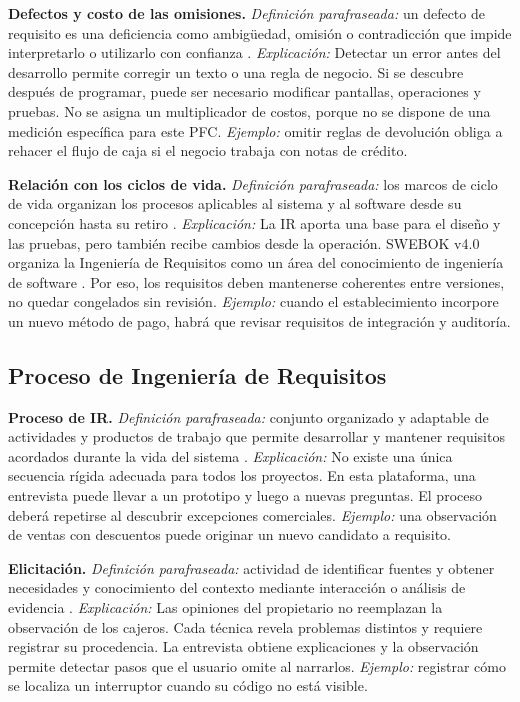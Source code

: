 \documentclass[onecolumn,12pt,a4paper]{IEEEtran}
\begin{document}
\textbf{Defectos y costo de las omisiones.} \emph{Definición parafraseada:} un defecto de requisito es una deficiencia como ambigüedad, omisión o contradicción que impide interpretarlo o utilizarlo con confianza \cite{iso29148,wiegers2013}. \emph{Explicación:} Detectar un error antes del desarrollo permite corregir un texto o una regla de negocio. Si se descubre después de programar, puede ser necesario modificar pantallas, operaciones y pruebas. No se asigna un multiplicador de costos, porque no se dispone de una medición específica para este PFC. \emph{Ejemplo:} omitir reglas de devolución obliga a rehacer el flujo de caja si el negocio trabaja con notas de crédito.

\textbf{Relación con los ciclos de vida.} \emph{Definición parafraseada:} los marcos de ciclo de vida organizan los procesos aplicables al sistema y al software desde su concepción hasta su retiro \cite{iso15288,iso12207}. \emph{Explicación:} La IR aporta una base para el diseño y las pruebas, pero también recibe cambios desde la operación. SWEBOK v4.0 organiza la Ingeniería de Requisitos como un área del conocimiento de ingeniería de software \cite{swebok4}. Por eso, los requisitos deben mantenerse coherentes entre versiones, no quedar congelados sin revisión. \emph{Ejemplo:} cuando el establecimiento incorpore un nuevo método de pago, habrá que revisar requisitos de integración y auditoría.

\subsection{Proceso de Ingeniería de Requisitos}

\textbf{Proceso de IR.} \emph{Definición parafraseada:} conjunto organizado y adaptable de actividades y productos de trabajo que permite desarrollar y mantener requisitos acordados durante la vida del sistema \cite{pohl2025,swebok4,ireb2023}. \emph{Explicación:} No existe una única secuencia rígida adecuada para todos los proyectos. En esta plataforma, una entrevista puede llevar a un prototipo y luego a nuevas preguntas. El proceso deberá repetirse al descubrir excepciones comerciales. \emph{Ejemplo:} una observación de ventas con descuentos puede originar un nuevo candidato a requisito.

\textbf{Elicitación.} \emph{Definición parafraseada:} actividad de identificar fuentes y obtener necesidades y conocimiento del contexto mediante interacción o análisis de evidencia \cite{pohl2025,ireb2023}. \emph{Explicación:} Las opiniones del propietario no reemplazan la observación de los cajeros. Cada técnica revela problemas distintos y requiere registrar su procedencia. La entrevista obtiene explicaciones y la observación permite detectar pasos que el usuario omite al narrarlos. \emph{Ejemplo:} registrar cómo se localiza un interruptor cuando su código no está visible.
\end{document}
